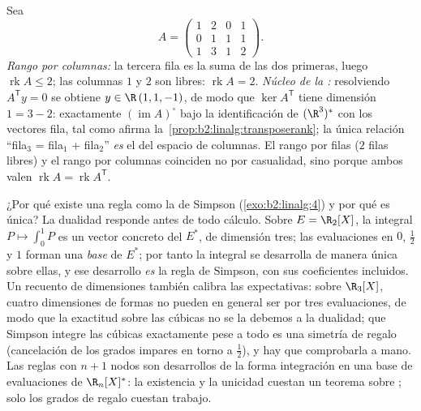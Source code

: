 \begin{example}\label{ex:b2:linalg:rankbothsides}
Sea
\[
A = \begin{pmatrix}
1 & 2 & 0 & 1\\
0 & 1 & 1 & 1\\
1 & 3 & 1 & 2
\end{pmatrix} .
\]
\emph{Rango por columnas:} la tercera fila es la suma de las dos
primeras, luego $\operatorname{rk} A \leq 2$; las columnas $1$ y $2$
son libres: $\operatorname{rk} A = 2$. \emph{Núcleo de la
:} resolviendo $A^{\mathsf T}y = 0$ se obtiene $y \in
\R\,(1, 1, -1)$, de modo que $\ker A^{\mathsf T}$ tiene dimensión $1
= 3 - 2$: exactamente $(\operatorname{im} A)^\circ$ bajo la
identificación de $(\R^3)^*$ con los vectores fila, tal como afirma
la~\cref{prop:b2:linalg:transposerank}; la única relación
``fila$_3$ = fila$_1$ + fila$_2$'' \emph{es} el  del
espacio de columnas. El rango por filas ($2$ filas libres) y el
rango por columnas coinciden no por casualidad, sino porque ambos
valen $\operatorname{rk} A = \operatorname{rk} A^{\mathsf T}$.
\end{example}

\begin{example}\label{ex:b2:linalg:quadratureread}
¿Por qué existe una regla como la de Simpson
(\cref{exo:b2:linalg:4}) y por qué es única? La dualidad responde
antes de todo cálculo. Sobre $E = \R_2[X]$, la integral $P \mapsto
\int_0^1 P$ es un vector concreto del  $E^*$, de dimensión
tres; las evaluaciones en $0$, $\frac12$ y $1$ forman una
\emph{base} de $E^*$; por tanto la integral se desarrolla de manera
única sobre ellas, y ese desarrollo \emph{es} la regla de Simpson,
con sus coeficientes incluidos. Un recuento de dimensiones también
calibra las expectativas: sobre $\R_3[X]$, cuatro dimensiones de
formas no pueden en general ser  por tres evaluaciones, de
modo que la exactitud sobre las cúbicas no se la debemos a la
dualidad; que Simpson integre las cúbicas exactamente pese a todo
es una simetría de regalo (cancelación de los grados impares en
torno a $\frac12$), y hay que comprobarla a mano. Las reglas con $n
+ 1$ nodos son desarrollos de la forma integración en una base de
evaluaciones de $\R_n[X]^*$: la existencia y la unicidad cuestan un
teorema sobre ; solo los grados de regalo cuestan
trabajo.
\end{example}

